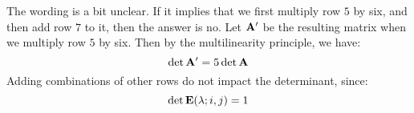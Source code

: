\begin{sol}
    The wording is a bit unclear. If it implies that we first multiply row $5$ by six, and then add row $7$ to it, then the answer is no. Let $\mathbf{A'}$ be the resulting matrix when we multiply row $5$ by six. Then by the multilinearity principle, we have:
    \begin{equation}
        \det \mathbf{A'} = 5 \det \mathbf{A}
    \end{equation}
    Adding combinations of other rows do not impact the determinant, since:
    \begin{equation}
        \det \mathbf{E}(\lambda;i,j) = 1
    \end{equation}
\end{sol}